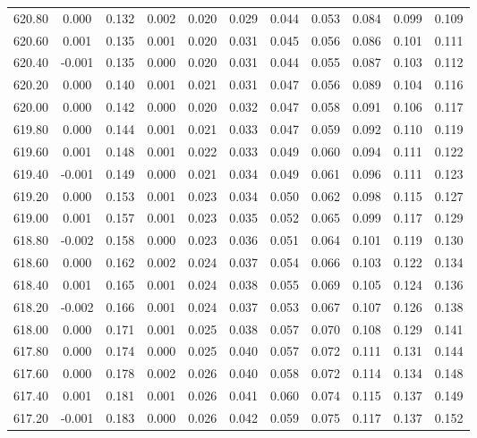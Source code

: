 \begin{longtable}{cccccccccc}
    620.80 &  0.000 &  0.132 &  0.002 &  0.020 &  0.029 &  0.044 &  0.053 &  0.084 &  0.099 &  0.109 \\
    620.60 &  0.001 &  0.135 &  0.001 &  0.020 &  0.031 &  0.045 &  0.056 &  0.086 &  0.101 &  0.111 \\
    620.40 & -0.001 &  0.135 &  0.000 &  0.020 &  0.031 &  0.044 &  0.055 &  0.087 &  0.103 &  0.112 \\
    620.20 &  0.000 &  0.140 &  0.001 &  0.021 &  0.031 &  0.047 &  0.056 &  0.089 &  0.104 &  0.116 \\
    620.00 &  0.000 &  0.142 &  0.000 &  0.020 &  0.032 &  0.047 &  0.058 &  0.091 &  0.106 &  0.117 \\
    619.80 &  0.000 &  0.144 &  0.001 &  0.021 &  0.033 &  0.047 &  0.059 &  0.092 &  0.110 &  0.119 \\
    619.60 &  0.001 &  0.148 &  0.001 &  0.022 &  0.033 &  0.049 &  0.060 &  0.094 &  0.111 &  0.122 \\
    619.40 & -0.001 &  0.149 &  0.000 &  0.021 &  0.034 &  0.049 &  0.061 &  0.096 &  0.111 &  0.123 \\
    619.20 &  0.000 &  0.153 &  0.001 &  0.023 &  0.034 &  0.050 &  0.062 &  0.098 &  0.115 &  0.127 \\
    619.00 &  0.001 &  0.157 &  0.001 &  0.023 &  0.035 &  0.052 &  0.065 &  0.099 &  0.117 &  0.129 \\
    618.80 & -0.002 &  0.158 &  0.000 &  0.023 &  0.036 &  0.051 &  0.064 &  0.101 &  0.119 &  0.130 \\
    618.60 &  0.000 &  0.162 &  0.002 &  0.024 &  0.037 &  0.054 &  0.066 &  0.103 &  0.122 &  0.134 \\
    618.40 &  0.001 &  0.165 &  0.001 &  0.024 &  0.038 &  0.055 &  0.069 &  0.105 &  0.124 &  0.136 \\
    618.20 & -0.002 &  0.166 &  0.001 &  0.024 &  0.037 &  0.053 &  0.067 &  0.107 &  0.126 &  0.138 \\
    618.00 &  0.000 &  0.171 &  0.001 &  0.025 &  0.038 &  0.057 &  0.070 &  0.108 &  0.129 &  0.141 \\
    617.80 &  0.000 &  0.174 &  0.000 &  0.025 &  0.040 &  0.057 &  0.072 &  0.111 &  0.131 &  0.144 \\
    617.60 &  0.000 &  0.178 &  0.002 &  0.026 &  0.040 &  0.058 &  0.072 &  0.114 &  0.134 &  0.148 \\
    617.40 &  0.001 &  0.181 &  0.001 &  0.026 &  0.041 &  0.060 &  0.074 &  0.115 &  0.137 &  0.149 \\
    617.20 & -0.001 &  0.183 &  0.000 &  0.026 &  0.042 &  0.059 &  0.075 &  0.117 &  0.137 &  0.152 \\

\end{longtable}
